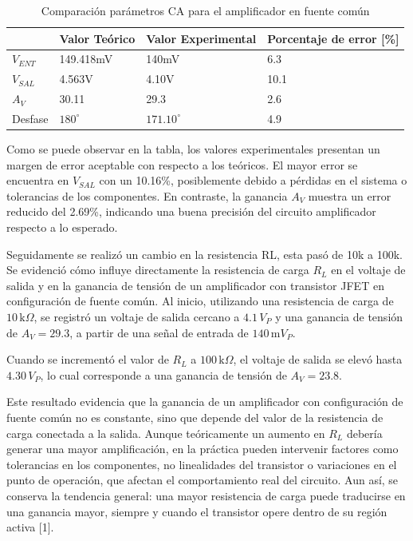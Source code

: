 \documentclass[journal]{IEEEtran}
\begin{document}
	\begin{table}[h]
		\caption{Comparación parámetros CA para el amplificador en fuente común}
		\centering
		\renewcommand{\arraystretch}{1.2} %
		\begin{tabular}{|l|p{2cm}|p{2cm}|p{2cm}|}
			\hline
			& \textbf{Valor Teórico} & \textbf{Valor Experimental} & \textbf{Porcentaje de error [\%]} \\
			\hline
			\( V_{ENT} \) & 149.418mV  & 140mV  & 6.3 \\
			\hline
			\( V_{SAL} \) & 4.563V   & 4.10V  & 10.1 \\
			\hline
			\( A_V \) & 30.11 & 29.3 & 2.6 \\
			\hline
			Desfase & $180^\circ$  & $171.10^\circ$  & 4.9 \\
			\hline
		\end{tabular}
		\label{tab:CA}
	\end{table}
	\par Como se puede observar en la tabla, los valores experimentales presentan un margen de error aceptable con respecto a los teóricos. El mayor error se encuentra en $V_{SAL}$ con un 10.16\%, posiblemente debido a pérdidas en el sistema o tolerancias de los componentes. En contraste, la ganancia $A_V$ muestra un error reducido del 2.69\%, indicando una buena precisión del circuito amplificador respecto a lo esperado.

	\par Seguidamente se realizó un cambio en la resistencia RL, esta pasó de 10k a 100k.
	Se evidenció cómo influye directamente la resistencia de carga \( R_L \) en el voltaje de salida y en la ganancia de tensión de un amplificador con transistor JFET en configuración de fuente común. Al inicio, utilizando una resistencia de carga de \( 10\,\text{k}\Omega \), se registró un voltaje de salida cercano a \( 4.1\,V_P \) y una ganancia de tensión de \( A_V = 29.3 \), a partir de una señal de entrada de \( 140\,\text{m}V_P \).

	Cuando se incrementó el valor de \( R_L \) a \( 100\,\text{k}\Omega \), el voltaje de salida se elevó hasta \( 4.30\,V_P \), lo cual corresponde a una ganancia de tensión de \( A_V = 23.8 \).

	Este resultado evidencia que la ganancia de un amplificador con configuración de fuente común no es constante, sino que depende del valor de la resistencia de carga conectada a la salida. Aunque teóricamente un aumento en \( R_L \) debería generar una mayor amplificación, en la práctica pueden intervenir factores como tolerancias en los componentes, no linealidades del transistor o variaciones en el punto de operación, que afectan el comportamiento real del circuito. Aun así, se conserva la tendencia general: una mayor resistencia de carga puede traducirse en una ganancia mayor, siempre y cuando el transistor opere dentro de su región activa [1].
\end{document}
